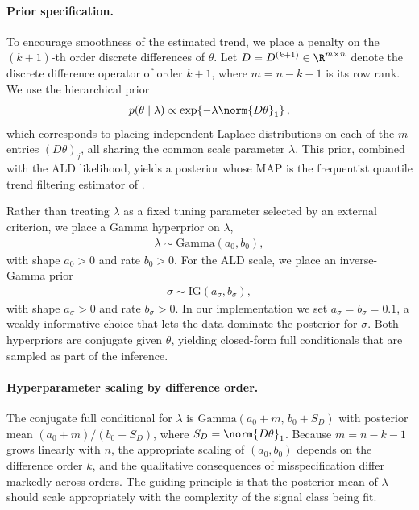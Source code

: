 \paragraph{Prior specification.}
To encourage smoothness of the estimated trend, we place a penalty on the $(k+1)$-th order discrete differences of $\theta$. Let $D = D^{(k+1)} \in \R^{m \times n}$ denote the discrete difference operator of order $k+1$, where $m = n - k - 1$ is its row rank. We use the hierarchical prior
\begin{align*}
    p(\theta \mid \lambda) \propto
    \exp\!\left\{-\lambda \norm{D\theta}_1\right\},
\end{align*}
which corresponds to placing independent Laplace distributions on each of the $m$ entries $(D\theta)_j$, all sharing the common scale parameter $\lambda$. This prior, combined with the ALD likelihood, yields a posterior whose MAP is the frequentist quantile trend filtering estimator of \citet{brantley2020baseline}.

Rather than treating $\lambda$ as a fixed tuning parameter selected by an external criterion, we place a Gamma hyperprior on $\lambda$,
\begin{align*}
    \lambda \sim \mathrm{Gamma}(a_0, b_0),
\end{align*}
with shape $a_0 > 0$ and rate $b_0 > 0$. For the ALD scale, we place an inverse-Gamma prior
\begin{align*}
    \sigma \sim \mathrm{IG}(a_\sigma, b_\sigma),
\end{align*}
with shape $a_\sigma > 0$ and rate $b_\sigma > 0$. In our implementation we set $a_\sigma = b_\sigma = 0.1$, a weakly informative choice that lets the data dominate the posterior for $\sigma$. Both hyperpriors are conjugate given $\theta$, yielding closed-form full conditionals that are sampled as part of the inference.

\paragraph{Hyperparameter scaling by difference order.}
The conjugate full conditional for $\lambda$ is $\mathrm{Gamma}(a_0 + m,\, b_0 + S_D)$ with posterior mean $(a_0 + m)/(b_0 + S_D)$, where $S_D = \norm{D\theta}_1$. Because $m = n - k - 1$ grows linearly with $n$, the appropriate scaling of $(a_0, b_0)$ depends on the difference order $k$, and the qualitative consequences of misspecification differ markedly across orders. The guiding principle is that the posterior mean of $\lambda$ should scale appropriately with the complexity of the signal class being fit.

